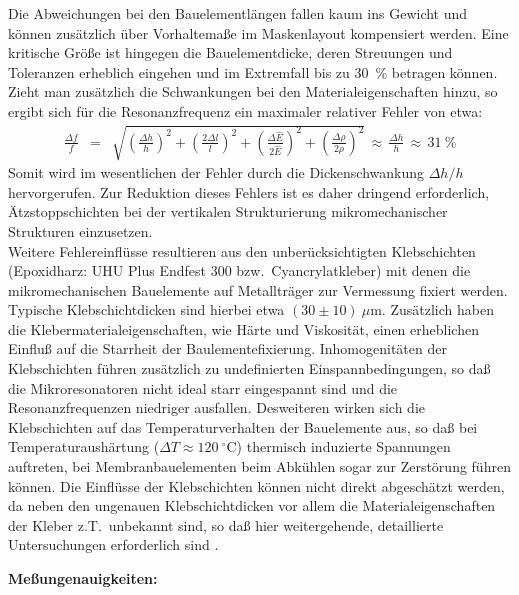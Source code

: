 Die Abweichungen bei den Bauelementlängen fallen kaum ins Gewicht und
können zusätzlich über Vorhaltemaße
im Maskenlayout kompensiert werden. Eine kritische Größe ist hingegen die
Bauelementdicke, deren Streuungen und Toleranzen erheblich eingehen und
im Extremfall bis zu 30~\% betragen können. Zieht man zusätzlich die
Schwankungen bei den Materialeigenschaften hinzu, so ergibt sich für die
Resonanzfrequenz ein maximaler relativer Fehler von etwa:
\begin{eqnarray}
\label{relfehlerfreq}
 \frac{\Delta f}{f} & = & \sqrt{
       {\left( \frac{\Delta h}{h} \right)}^2 +
       {\left( \frac{2\Delta l}{l} \right)}^2 +
       {\left( \frac{\Delta \hat E}{2 \hat E} \right)}^2 +
       {\left( \frac{\Delta \rho}{2 \rho} \right)}^2 }
   \, \approx \, \frac{\Delta h}{h} \, \approx \, 31~\%
\end{eqnarray}
Somit wird im wesentlichen der Fehler durch die Dickenschwankung
$\Delta h/h$ hervorgerufen. Zur Reduktion dieses Fehlers ist es daher
dringend erforderlich, Ätzstoppschichten bei der vertikalen Strukturierung
mikromechanischer Strukturen einzusetzen. \\
%
Weitere Fehlereinflüsse resultieren aus den unberücksichtigten Klebschichten
(Epoxidharz: UHU Plus Endfest 300 bzw.\ Cyancrylatkleber) mit denen die
mikromechanischen Bauelemente auf Metallträger zur Vermessung fixiert werden.
Typische Klebschichtdicken sind hierbei etwa $(30\pm10)~\mu$m. Zusätzlich
haben die Klebermaterialeigenschaften, wie Härte und Viskosität, einen
erheblichen Einfluß auf die Starrheit der Baulementefixierung.
Inhomogenitäten der Klebschichten führen zusätzlich zu undefinierten
Einspannbedingungen, so daß die Mikroresonatoren
nicht ideal starr eingespannt sind und die Resonanzfrequenzen niedriger
ausfallen. Desweiteren wirken sich die Klebschichten auf das
Temperaturverhalten der Bauelemente aus, so daß bei Temperaturaushärtung
($\Delta T \approx 120~^{\circ}$C) thermisch induzierte Spannungen auftreten,
bei Membranbauelementen beim Abkühlen sogar zur Zerstörung führen können.
Die Einflüsse der Klebschichten können nicht direkt abgeschätzt werden, da
neben den ungenauen Klebschichtdicken vor allem die Materialeigenschaften
der Kleber z.T.\ unbekannt sind, so daß hier weitergehende, detaillierte
Untersuchungen erforderlich sind \cite{Jauch}.


{\bf Meßungenauigkeiten:}

